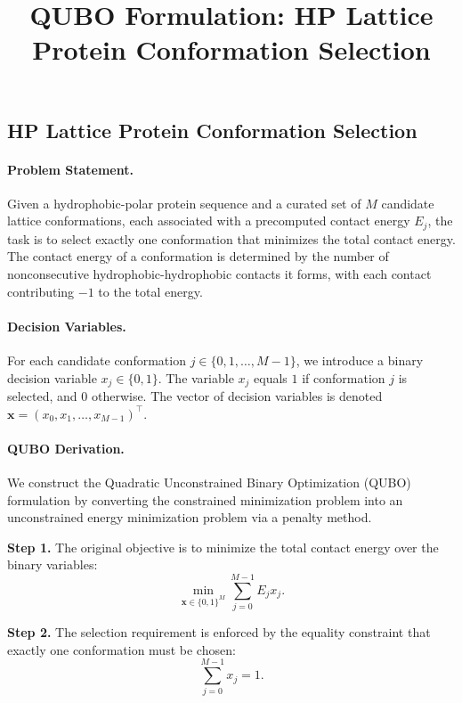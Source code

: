 \documentclass[12pt]{article}
\title{QUBO Formulation: HP Lattice Protein Conformation Selection}
\date{}
\begin{document}
\maketitle

\subsection*{HP Lattice Protein Conformation Selection}

\paragraph{Problem Statement.}
Given a hydrophobic-polar protein sequence and a curated set of $M$ candidate lattice conformations, each associated with a precomputed contact energy $E_j$, the task is to select exactly one conformation that minimizes the total contact energy. The contact energy of a conformation is determined by the number of nonconsecutive hydrophobic-hydrophobic contacts it forms, with each contact contributing $-1$ to the total energy.

\paragraph{Decision Variables.}
For each candidate conformation $j \in \{0, 1, \dots, M-1\}$, we introduce a binary decision variable $x_j \in \{0, 1\}$. The variable $x_j$ equals $1$ if conformation $j$ is selected, and $0$ otherwise. The vector of decision variables is denoted $\mathbf{x} = (x_0, x_1, \dots, x_{M-1})^\top$.

\paragraph{QUBO Derivation.}
We construct the Quadratic Unconstrained Binary Optimization (QUBO) formulation by converting the constrained minimization problem into an unconstrained energy minimization problem via a penalty method.

\textbf{Step 1.} The original objective is to minimize the total contact energy over the binary variables:
\begin{equation}
\min_{\mathbf{x} \in \{0,1\}^M} \sum_{j=0}^{M-1} E_j x_j.
\end{equation}

\textbf{Step 2.} The selection requirement is enforced by the equality constraint that exactly one conformation must be chosen:
\begin{equation}
\sum_{j=0}^{M-1} x_j = 1.
\end{equation}
\end{document}
